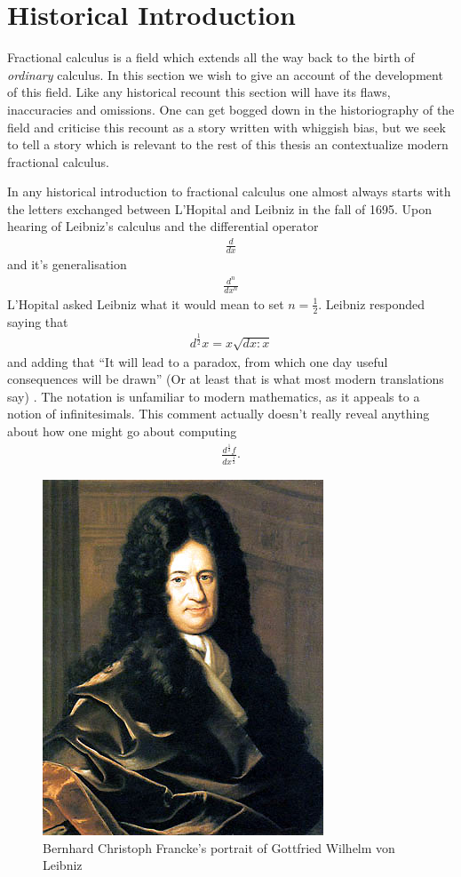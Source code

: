 \section{Historical Introduction}
Fractional calculus is a field which extends all the way back to the birth of \emph{ordinary} calculus. In this section we wish to give an account of the development of this field. Like any historical recount this section will have its flaws, inaccuracies and omissions. One can get bogged down in the historiography of the field and criticise this recount as a story written with whiggish bias, but we seek to tell a story which is relevant to the rest of this thesis an contextualize modern fractional calculus.

In any historical introduction to fractional calculus one almost always starts with the letters exchanged between L'Hopital and Leibniz in the fall of 1695. Upon hearing of Leibniz's calculus and the differential operator
\begin{align}
    \frac{d}{dx}
\end{align}
and it's generalisation
\begin{align}
    \frac{d^n}{dx^n}
\end{align}
L'Hopital asked Leibniz what it would mean to set $ n = \frac{1}{2} $. Leibniz responded saying that 
\begin{align}
    d^\frac{1}{2}x = x\sqrt{dx:x}
\end{align} and adding that
``It will lead to a paradox, from which one day useful consequences will be drawn'' (Or at least that is what most modern translations say) \cite{Abbas2012}. The notation is unfamiliar to modern mathematics, as it appeals to a notion of infinitesimals. This comment actually doesn't really reveal anything about how one might go about computing
\begin{align}
    \frac{d^\frac{1}{2}f}{dx^\frac{1}{2}}.
\end{align}

\begin{figure}
    \includegraphics[scale=0.4]{images/Gottfried_Wilhelm_von_Leibniz}
    \caption{Bernhard Christoph Francke's portrait of Gottfried Wilhelm von Leibniz}
\end{figure}

